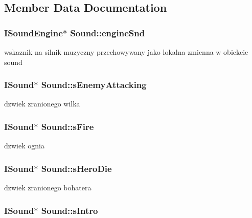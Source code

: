 \subsection{Member Data Documentation}
\hypertarget{class_sound_afbc43d3c59583a6ae5d0fb511f31448d}{
\subsubsection[{engineSnd}]{\setlength{\rightskip}{0pt plus 5cm}ISoundEngine$\ast$ {\bf Sound::engineSnd}}}
\label{class_sound_afbc43d3c59583a6ae5d0fb511f31448d}
wskaznik na silnik muzyczny przechowywany jako lokalna zmienna w obiekcie sound \hypertarget{class_sound_a675a65579f9f4b42e7ff1191417e7229}{
\subsubsection[{sEnemyAttacking}]{\setlength{\rightskip}{0pt plus 5cm}ISound$\ast$ {\bf Sound::sEnemyAttacking}}}
\label{class_sound_a675a65579f9f4b42e7ff1191417e7229}
dzwiek zranionego wilka \hypertarget{class_sound_a443857ecec851ccd50833993807e7bdb}{
\subsubsection[{sFire}]{\setlength{\rightskip}{0pt plus 5cm}ISound$\ast$ {\bf Sound::sFire}}}
\label{class_sound_a443857ecec851ccd50833993807e7bdb}
dzwiek ognia \hypertarget{class_sound_a99475d2ce42a16175b06d47bcc018294}{
\subsubsection[{sHeroDie}]{\setlength{\rightskip}{0pt plus 5cm}ISound$\ast$ {\bf Sound::sHeroDie}}}
\label{class_sound_a99475d2ce42a16175b06d47bcc018294}
dzwiek zranionego bohatera \hypertarget{class_sound_a0dde397779cc020d93c28aa98b2ba942}{
\subsubsection[{sIntro}]{\setlength{\rightskip}{0pt plus 5cm}ISound$\ast$ {\bf Sound::sIntro}}}
